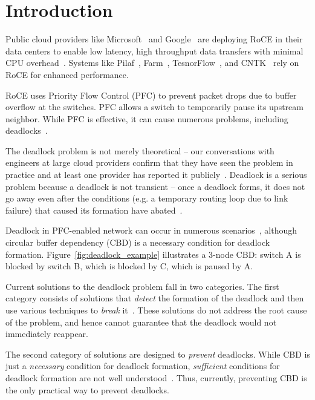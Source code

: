 \section{Introduction}
\label{sec:intro}

Public cloud providers like Microsoft~\cite{dcqcn} and Google~\cite{timely} are
deploying RoCE in their data centers to enable low latency, high throughput data
transfers with minimal CPU overhead~\cite{dcqcn}. Systems like
Pilaf~\cite{pilaf}, Farm~\cite{farm}, TesnorFlow~\cite{tensorflow}, and
CNTK~\cite{cntk} rely on RoCE for enhanced performance.

RoCE uses Priority Flow Control (PFC) to prevent packet drops due to buffer
overflow at the switches. PFC allows a switch to temporarily pause its upstream
neighbor. While PFC is effective, it can cause numerous problems,
including deadlocks~\cite{rdmaatscale,tcpbolt,hu2016deadlocks,dcqcn}.

The deadlock problem is not merely theoretical -- our conversations with
engineers at large cloud providers confirm that they have seen the problem in
practice and at least one provider has reported it publicly~\cite{rdmaatscale}.
Deadlock is a serious problem because a deadlock is not transient -- once a
deadlock forms, it does not go away even after the conditions (e.g. a temporary
routing loop due to link failure) that caused its formation have
abated~\cite{rdmaatscale}.

Deadlock in PFC-enabled network can occur in numerous
scenarios~\cite{hu2016deadlocks}, although circular buffer dependency (CBD) is a
necessary condition for deadlock formation.  Figure~\ref{fig:deadlock_example}
illustrates a 3-node CBD: switch A is blocked by switch B, which is blocked by
C, which is paused by A. 

Current solutions to the deadlock problem fall in two categories. The first
category consists of solutions that {\em detect} the formation of the deadlock
and then use various techniques to {\em break} it~\cite{shpiner2016unlocking}.
These solutions do not address the root cause of the problem, and hence cannot
guarantee that the deadlock would not immediately reappear. 

The second category of solutions are designed to {\em prevent} deadlocks.  While
CBD is just a {\em necessary} condition for deadlock formation, {\em sufficient}
conditions for deadlock formation are not well
understood~\cite{hu2016deadlocks}. Thus, currently, preventing CBD is the only
practical way to prevent deadlocks. 

